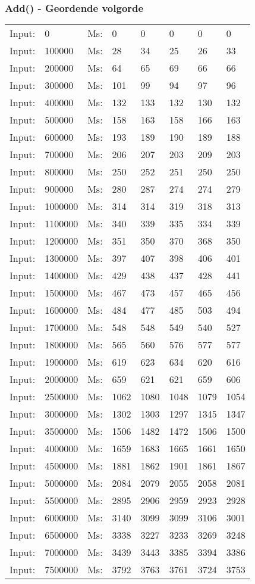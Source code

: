 \documentclass[11pt,a4paper]{report}
\begin{document}
\begin{tiny}
\subsubsection*{Add() - Geordende volgorde}
\begin{tabular}{l l ||l  l  l  l  l  l}
Input:&0&Ms:&0&0&0&0&0\\
Input:&100000&Ms:&28&34&25&26&33\\
Input:&200000&Ms:&64&65&69&66&66\\
Input:&300000&Ms:&101&99&94&97&96\\
Input:&400000&Ms:&132&133&132&130&132\\
Input:&500000&Ms:&158&163&158&166&163\\
Input:&600000&Ms:&193&189&190&189&188\\
Input:&700000&Ms:&206&207&203&209&203\\
Input:&800000&Ms:&250&252&251&250&250\\
Input:&900000&Ms:&280&287&274&274&279\\
Input:&1000000&Ms:&314&314&319&318&313\\
Input:&1100000&Ms:&340&339&335&334&339\\
Input:&1200000&Ms:&351&350&370&368&350\\
Input:&1300000&Ms:&397&407&398&406&401\\
Input:&1400000&Ms:&429&438&437&428&441\\
Input:&1500000&Ms:&467&473&457&465&456\\
Input:&1600000&Ms:&484&477&485&503&494\\
Input:&1700000&Ms:&548&548&549&540&527\\
Input:&1800000&Ms:&565&560&576&577&577\\
Input:&1900000&Ms:&619&623&634&620&616\\
Input:&2000000&Ms:&659&621&621&659&606\\
Input:&2500000&Ms:&1062&1080&1048&1079&1054\\
Input:&3000000&Ms:&1302&1303&1297&1345&1347\\
Input:&3500000&Ms:&1506&1482&1472&1506&1500\\
Input:&4000000&Ms:&1659&1683&1665&1661&1650\\
Input:&4500000&Ms:&1881&1862&1901&1861&1867\\
Input:&5000000&Ms:&2084&2079&2055&2058&2081\\
Input:&5500000&Ms:&2895&2906&2959&2923&2928\\
Input:&6000000&Ms:&3140&3099&3099&3106&3001\\
Input:&6500000&Ms:&3338&3227&3233&3269&3248\\
Input:&7000000&Ms:&3439&3443&3385&3394&3386\\
Input:&7500000&Ms:&3792&3763&3761&3724&3753\\
\end{tabular}
\\

\end{tiny}
\end{document}
